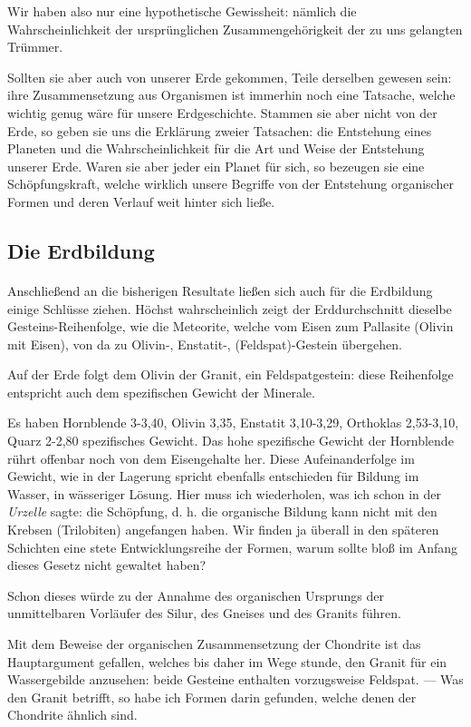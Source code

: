 \documentclass[a4paper, 12pt, oneside]{article}
\begin{document}
Wir haben also nur eine hypothetische Gewissheit: nämlich die Wahrscheinlichkeit der ursprünglichen Zusammengehörigkeit der zu uns gelangten Trümmer.

Sollten sie aber auch von unserer Erde gekommen, Teile derselben gewesen sein: ihre Zusammensetzung aus Organismen ist immerhin noch eine Tatsache, welche wichtig genug wäre für unsere Erdgeschichte. Stammen sie aber nicht von der Erde, so geben sie uns die Erklärung zweier Tatsachen: die Entstehung eines Planeten und die Wahrscheinlichkeit für die Art und Weise der Entstehung unserer Erde. Waren sie aber jeder ein Planet für sich, so bezeugen sie eine Schöpfungskraft, welche wirklich unsere Begriffe von der Entstehung organischer Formen und deren Verlauf weit hinter sich ließe.
\clearpage
\subsection{Die Erdbildung}
\paragraph{}
Anschließend an die bisherigen Resultate ließen sich auch für die Erdbildung einige Schlüsse ziehen. Höchst wahrscheinlich zeigt der Erddurchschnitt dieselbe Gesteins-Reihenfolge, wie die Meteorite, welche vom Eisen zum Pallasite (Olivin mit Eisen), von da zu Olivin-, Enstatit-, (Feldspat)-Gestein übergehen.

Auf der Erde folgt dem Olivin der Granit, ein Feldspatgestein: diese Reihenfolge entspricht auch dem spezifischen Gewicht der Minerale.

Es haben Hornblende 3-3,40, Olivin 3,35, Enstatit 3,10-3,29, Orthoklas 2,53-3,10, Quarz 2-2,80 spezifisches Gewicht. Das hohe spezifische Gewicht der Hornblende rührt offenbar noch von dem Eisengehalte her. Diese Aufeinanderfolge im Gewicht, wie in der Lagerung spricht ebenfalls entschieden für Bildung im Wasser, in wässeriger Lösung. Hier muss ich wiederholen, was ich schon in der \emph{Urzelle} sagte: die Schöpfung, d. h. die organische Bildung kann nicht mit den Krebsen (Trilobiten) angefangen haben. Wir finden ja überall in den späteren Schichten eine stete Entwicklungsreihe der Formen, warum sollte bloß im Anfang dieses Gesetz nicht gewaltet haben?

Schon dieses würde zu der Annahme des organischen Ursprungs der unmittelbaren Vorläufer des Silur, des Gneises und des Granits führen.

Mit dem Beweise der organischen Zusammensetzung der Chondrite ist das Hauptargument gefallen, welches bis daher im Wege stunde, den Granit für ein Wassergebilde anzusehen: beide Gesteine enthalten vorzugsweise Feldspat. — Was den Granit betrifft, so habe ich Formen darin gefunden, welche denen der Chondrite ähnlich sind.
\end{document}
